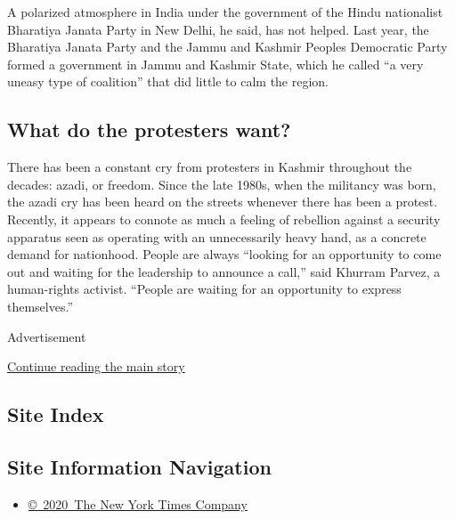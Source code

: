 A polarized atmosphere in India under the government of the Hindu
nationalist Bharatiya Janata Party in New Delhi, he said, has not
helped. Last year, the Bharatiya Janata Party and the Jammu and Kashmir
Peoples Democratic Party formed a government in Jammu and Kashmir State,
which he called ``a very uneasy type of coalition'' that did little to
calm the region.

\hypertarget{what-do-the-protesters-want}{%
\subsection{What do the protesters
want?}\label{what-do-the-protesters-want}}

There has been a constant cry from protesters in Kashmir throughout the
decades: azadi, or freedom. Since the late 1980s, when the militancy was
born, the azadi cry has been heard on the streets whenever there has
been a protest. Recently, it appears to connote as much a feeling of
rebellion against a security apparatus seen as operating with an
unnecessarily heavy hand, as a concrete demand for nationhood. People
are always ``looking for an opportunity to come out and waiting for the
leadership to announce a call,'' said Khurram Parvez, a human-rights
activist. ``People are waiting for an opportunity to express
themselves.''

Advertisement

\protect\hyperlink{after-bottom}{Continue reading the main story}

\hypertarget{site-index}{%
\subsection{Site Index}\label{site-index}}

\hypertarget{site-information-navigation}{%
\subsection{Site Information
Navigation}\label{site-information-navigation}}

\begin{itemize}
\tightlist
\item
  \href{https://help.nytimes.com/hc/en-us/articles/115014792127-Copyright-notice}{©~2020~The
  New York Times Company}
\end{itemize}

